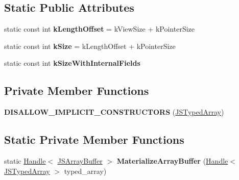 \subsection*{Static Public Attributes}
\begin{DoxyCompactItemize}
\item 
static const int {\bfseries k\+Length\+Offset} = k\+View\+Size + k\+Pointer\+Size\hypertarget{classv8_1_1internal_1_1_j_s_typed_array_afa057f06964f45e0c4f8608cff1ce29d}{}\label{classv8_1_1internal_1_1_j_s_typed_array_afa057f06964f45e0c4f8608cff1ce29d}

\item 
static const int {\bfseries k\+Size} = k\+Length\+Offset + k\+Pointer\+Size\hypertarget{classv8_1_1internal_1_1_j_s_typed_array_a006a87f75ba3983cea6af3324d258eff}{}\label{classv8_1_1internal_1_1_j_s_typed_array_a006a87f75ba3983cea6af3324d258eff}

\item 
static const int {\bfseries k\+Size\+With\+Internal\+Fields}
\end{DoxyCompactItemize}
\subsection*{Private Member Functions}
\begin{DoxyCompactItemize}
\item 
{\bfseries D\+I\+S\+A\+L\+L\+O\+W\+\_\+\+I\+M\+P\+L\+I\+C\+I\+T\+\_\+\+C\+O\+N\+S\+T\+R\+U\+C\+T\+O\+RS} (\hyperlink{classv8_1_1internal_1_1_j_s_typed_array}{J\+S\+Typed\+Array})\hypertarget{classv8_1_1internal_1_1_j_s_typed_array_a4ade741a7a521a2ab7cf6bbca02d6759}{}\label{classv8_1_1internal_1_1_j_s_typed_array_a4ade741a7a521a2ab7cf6bbca02d6759}

\end{DoxyCompactItemize}
\subsection*{Static Private Member Functions}
\begin{DoxyCompactItemize}
\item 
static \hyperlink{classv8_1_1internal_1_1_handle}{Handle}$<$ \hyperlink{classv8_1_1internal_1_1_j_s_array_buffer}{J\+S\+Array\+Buffer} $>$ {\bfseries Materialize\+Array\+Buffer} (\hyperlink{classv8_1_1internal_1_1_handle}{Handle}$<$ \hyperlink{classv8_1_1internal_1_1_j_s_typed_array}{J\+S\+Typed\+Array} $>$ typed\+\_\+array)\hypertarget{classv8_1_1internal_1_1_j_s_typed_array_a533a844ae68c602ed202ff7b02a51045}{}\label{classv8_1_1internal_1_1_j_s_typed_array_a533a844ae68c602ed202ff7b02a51045}

\end{DoxyCompactItemize}
